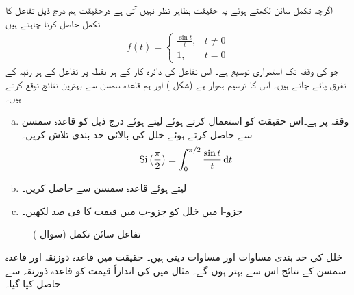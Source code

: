 اگرچہ تکمل سائن لکھتے ہوئے یہ حقیقت بظاہر نظر نہیں آتی ہے درحقیقت ہم درج ذیل تفاعل کا تکمل حاصل کرنا چاہتے ہیں
\begin{align*}
f(t)=
\begin{cases}
\frac{\sin t}{t},&t\ne 0\\
1,&t=0
\end{cases}
\end{align*}
جو  کی وقفہ  تک  استمراری توسیع ہے۔ اس تفاعل کی دائرہ کار کے ہر نقطہ پر تفاعل کے ہر رتبہ کے تفرق پائے جاتے ہیں۔ اس کا ترسیم ہموار ہے (شکل ) اور ہم قاعدہ سمسن سے بہترین نتائج توقع کرتے ہیں۔
\begin{enumerate}[a.]
\item
وقفہ  پر  ہے۔اس حقیقت کو استعمال کرتے ہوئے  لیتے ہوئے درج ذیل کو قاعدہ سمسن سے حاصل کرتے ہوئے خلل کی بالائی حد بندی تلاش کریں۔
\begin{align*}
\kSi\big(\frac{\pi}{2}\big)=\int_0^{\pi/2}\frac{\sin t}{t}\dif t
\end{align*}
\item
{} لیتے ہوئے قاعدہ سمسن سے  حاصل کریں۔
\item
جزو-ا میں خلل کو جزو-ب میں قیمت کا فی صد لکھیں۔
\end{enumerate}
\begin{figure}
\centering
{}
\caption{تفاعل سائن تکمل (سوال )}
\label{شکل_سوال_تکمل_سائن_تکمل}
\end{figure}
خلل کی حد بندی مساوات  اور مساوات  دیتی ہیں۔ حقیقت میں قاعدہ ذوزنقہ اور قاعدہ سمسن کے نتائج اس سے بہتر ہوں گے۔ مثال  میں  کی اندازاً قیمت کو قاعدہ ذوزنقہ سے حاصل کیا گیا۔
